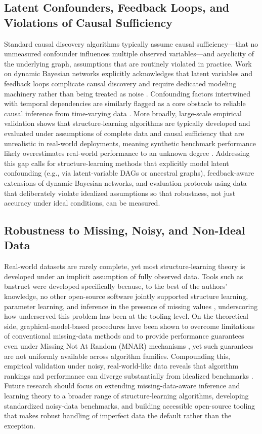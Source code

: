 \subsection{Latent Confounders, Feedback Loops, and Violations of Causal Sufficiency}
Standard causal discovery algorithms typically assume causal sufficiency---that no unmeasured confounder influences multiple observed variables---and acyclicity of the underlying graph, assumptions that are routinely violated in practice. Work on dynamic Bayesian networks explicitly acknowledges that latent variables and feedback loops complicate causal discovery and require dedicated modeling machinery rather than being treated as noise \cite{zhang2026causale}. Confounding factors intertwined with temporal dependencies are similarly flagged as a core obstacle to reliable causal inference from time-varying data \cite{zhang2026causalc}. More broadly, large-scale empirical validation shows that structure-learning algorithms are typically developed and evaluated under assumptions of complete data and causal sufficiency that are unrealistic in real-world deployments, meaning synthetic benchmark performance likely overestimates real-world performance to an unknown degree \cite{constantinou2021large}. Addressing this gap calls for structure-learning methods that explicitly model latent confounding (e.g., via latent-variable DAGs or ancestral graphs), feedback-aware extensions of dynamic Bayesian networks, and evaluation protocols using data that deliberately violate idealized assumptions so that robustness, not just accuracy under ideal conditions, can be measured.

\subsection{Robustness to Missing, Noisy, and Non-Ideal Data}
Real-world datasets are rarely complete, yet most structure-learning theory is developed under an implicit assumption of fully observed data. Tools such as bnstruct were developed specifically because, to the best of the authors' knowledge, no other open-source software jointly supported structure learning, parameter learning, and inference in the presence of missing values \cite{franzin2016bnstruct}, underscoring how underserved this problem has been at the tooling level. On the theoretical side, graphical-model-based procedures have been shown to overcome limitations of conventional missing-data methods and to provide performance guarantees even under Missing Not At Random (MNAR) mechanisms \cite{mohan2013graphical}, yet such guarantees are not uniformly available across algorithm families. Compounding this, empirical validation under noisy, real-world-like data reveals that algorithm rankings and performance can diverge substantially from idealized benchmarks \cite{constantinou2021large}. Future research should focus on extending missing-data-aware inference and learning theory to a broader range of structure-learning algorithms, developing standardized noisy-data benchmarks, and building accessible open-source tooling that makes robust handling of imperfect data the default rather than the exception.

